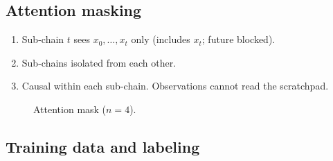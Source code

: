 \documentclass{article}
\begin{document}
\subsection{Attention masking}

\begin{enumerate}
    \item Sub-chain $t$ sees $x_0, \ldots, x_t$ only (includes $x_t$; future blocked).
    \item Sub-chains isolated from each other.
    \item Causal within each sub-chain. Observations cannot read the scratchpad.
\end{enumerate}

\begin{figure}[h]
\centering
{}
\caption{Attention mask ($n=4$).}
\label{fig:mask}
\end{figure}

\subsection{Training data and labeling}
\end{document}
